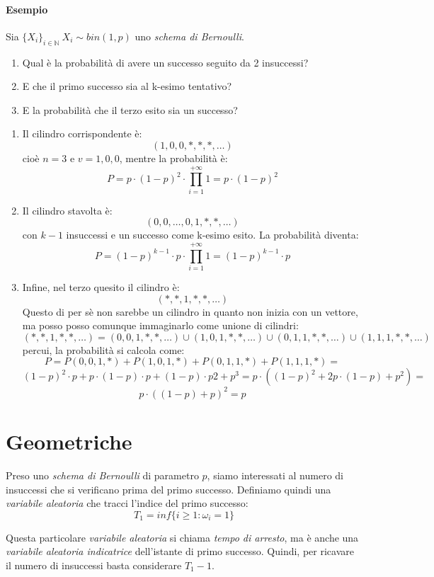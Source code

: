 \documentclass[12pt, a4paper]{report}
\theoremstyle{definition}
\DeclareRobustCommand{\N}{\mathbb{N}}%
\begin{document}
\paragraph*{Esempio}
Sia \(\{X_i\}_{i\in\N}\ X_i\sim bin(1,p)\) uno \emph{schema di Bernoulli}.
\begin{enumerate}
	\item Qual è la probabilità di avere un successo seguito da 2 insuccessi?
	\item E che il primo successo sia al k-esimo tentativo?
	\item E la probabilità che il terzo esito sia un successo?
\end{enumerate}

\begin{enumerate}
	\item Il cilindro corrispondente è:
	\[(1,0,0,*,*,*,\dots)\]
	cioè $n=3$ e $v={1,0,0}$, mentre la probabilità è:
	\[P = p\cdot (1-p)^2\cdot \prod_{i=1}^{+\infty}1=p\cdot (1-p)^2\]
	\item Il cilindro stavolta è:
	\[(0,0,\dots,0,1,*,*,\dots)\]
	con $k-1$ insuccessi e un successo come k-esimo esito. La probabilità diventa:
	\[P=(1-p)^{k-1}\cdot p\cdot \prod_{i=1}^{+\infty}1=(1-p)^{k-1}\cdot p\]
	\item Infine, nel terzo quesito il cilindro è:
	\[(*,*,1,*,*,\dots)\]
	Questo di per sè non sarebbe un cilindro in quanto non inizia con un vettore,
	ma posso posso comunque immaginarlo come unione di cilindri:
	\[(*,*,1,*,*,\dots)=(0,0,1,*,*,\dots)\cup(1,0,1,*,*,\dots)\cup(0,1,1,*,*
	,\dots)\cup(1,1,1,*,*,\dots)\]
	percui, la probabilità si calcola come:
	\[P=P(0,0,1,*)+P(1,0,1,*)+P(0,1,1,*)+P(1,1,1,*)=\]
	\[(1-p)^2\cdot p+p\cdot (1-p)\cdot p+(1-p)\cdot p2+p^3=p\cdot ((1-p)^2+2p
	\cdot (1-p)+p^2)=\]
	\[p\cdot ((1-p)+p)^2=p\]
\end{enumerate}

\section{Geometriche}
Preso uno \emph{schema di Bernoulli} di parametro $p$, siamo interessati al numero
di insuccessi che si verificano prima del primo successo. Definiamo quindi una
\emph{variabile aleatoria} che tracci l'indice del primo successo:
\[T_1=inf\{i\geq 1:\omega_i=1\}\]

Questa particolare \emph{variabile aleatoria} si chiama \emph{tempo di arresto},
ma è anche una \emph{variabile aleatoria indicatrice} dell'istante di primo
successo. Quindi, per ricavare il numero di insuccessi basta considerare $T_1-1$.
\end{document}
